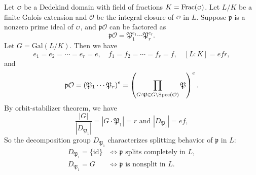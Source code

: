 \begin{proposition}{}{}
    Let $\mathcalo$ be a Dedekind domain with field of fractions $K=\mathrm{Frac}(\mathcalo)$. Let $L/K$ be a finite Galois extension and $\mathcal{O}$ be the integral closure of $\mathcalo$ in $L$. Suppose $\mathfrak p$ is a nonzero prime ideal of $\mathcalo$, and $\mathfrak p\mathcal{O}$ can be factored as
    \[
    \mathfrak p\mathcal{O}=\mathfrak P_1^{e_1}\cdots\mathfrak P_r^{e_r}.
    \]
    Let $G=\mathrm{Gal}(L/K)$. 
    Then we have 
    \[
    e_1=e_2=\cdots=e_r=e, \quad
    f_1=f_2=\cdots=f_r=f,\quad [L:K]=efr,
    \]
    and
    \[
        \mathfrak p\mathcal{O} =\left(  \mathfrak P_1\cdots\mathfrak P_r\right)^e=\left( \prod_{G\cdot \mathfrak P\in G\backslash \!\operatorname{Spec}\left(\mathcal{O}\right)}\mathfrak P\right)^e.
    \]
    By orbit-stabilizer theorem, we have
    \[
    \frac{\left|G\right|}{\left|D_{\mathfrak{P}_1}\right|}=|G \cdot \mathfrak{P}_1|=r\text{ and }\left|D_{\mathfrak{P}_1}\right|=ef,
    \]
    So the decomposition group $D_{\mathfrak{P}_1}$ characterizes splitting behavior of $\mathfrak{p}$ in $L$:
    \begin{align*}
        D_{\mathfrak{P}_1}=\{\mathrm{id}\}&\iff \mathfrak{p}\text{ splits completely in }L,\\
        D_{\mathfrak{P}_1}=G&\iff \mathfrak{p}\text{ is nonsplit in }L.
    \end{align*}
\end{proposition}
